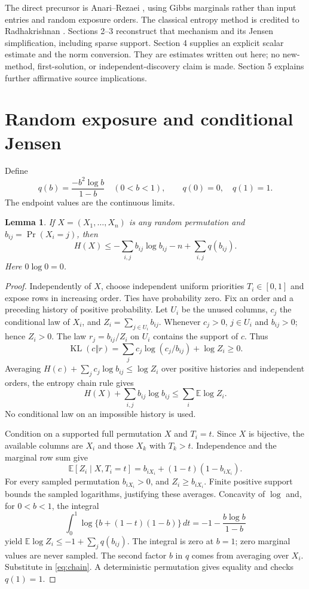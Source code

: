 \documentclass[11pt]{article}
\newtheorem{lemma}[corollary]{Lemma}
\newcommand{\KL}{\operatorname{KL}}
\newcommand{\E}{\mathbb E}
\begin{document}
The direct precursor is Anari--Rezaei \cite[\S4, Eq.~(6), p.~12]{AR}, using Gibbs marginals rather than input entries and random exposure orders. The classical entropy method is credited to Radhakrishnan \cite{R}. Sections 2--3 reconstruct that mechanism and its Jensen simplification, including sparse support. Section 4 supplies an explicit scalar estimate and the norm conversion. They are estimates written out here; no new-method, first-solution, or independent-discovery claim is made. Section 5 explains further affirmative source implications.

\section{Random exposure and conditional Jensen}
Define
\[
 q(b)=\frac{-b^2\log b}{1-b}\quad(0<b<1),\qquad q(0)=0,\quad q(1)=1.
\]
The endpoint values are the continuous limits.
\begin{lemma}\label{lem:entropy}
If $X=(X_1,\ldots,X_n)$ is any random permutation and $b_{ij}=\Pr(X_i=j)$, then
\begin{equation}\label{eq:entropy}
 H(X)\le-\sum_{i,j}b_{ij}\log b_{ij}-n+\sum_{i,j}q(b_{ij}).
\end{equation}
Here $0\log0=0$.
\end{lemma}
\begin{proof}
Independently of $X$, choose independent uniform priorities $T_i\in[0,1]$ and expose rows in increasing order. Ties have probability zero. Fix an order and a preceding history of positive probability. Let $U_i$ be the unused columns, $c_j$ the conditional law of $X_i$, and $Z_i=\sum_{j\in U_i}b_{ij}$. Whenever $c_j>0$, $j\in U_i$ and $b_{ij}>0$; hence $Z_i>0$. The law $r_j=b_{ij}/Z_i$ on $U_i$ contains the support of $c$. Thus
\[
 \KL(c\Vert r)=\sum_j c_j\log(c_j/b_{ij})+\log Z_i\ge0.
\]
Averaging $H(c)+\sum_jc_j\log b_{ij}\le\log Z_i$ over positive histories and independent orders, the entropy chain rule gives
\begin{equation}\label{eq:chain}
 H(X)+\sum_{i,j}b_{ij}\log b_{ij}\le\sum_i\E\log Z_i.
\end{equation}
No conditional law on an impossible history is used.

Condition on a supported full permutation $X$ and $T_i=t$. Since $X$ is bijective, the available columns are $X_i$ and those $X_k$ with $T_k>t$. Independence and the marginal row sum give
\[
 \E[Z_i\mid X,T_i=t]=b_{iX_i}+(1-t)(1-b_{iX_i}).
\]
For every sampled permutation $b_{iX_i}>0$, and $Z_i\ge b_{iX_i}$. Finite positive support bounds the sampled logarithms, justifying these averages. Concavity of $\log$ and, for $0<b<1$, the integral
\[
 \int_0^1\log\{b+(1-t)(1-b)\}\,dt
 =-1-\frac{b\log b}{1-b}
\]
yield $\E\log Z_i\le-1+\sum_jq(b_{ij})$. The integral is zero at $b=1$; zero marginal values are never sampled. The second factor $b$ in $q$ comes from averaging over $X_i$. Substitute in \eqref{eq:chain}. A deterministic permutation gives equality and checks $q(1)=1$.
\end{proof}
\end{document}
